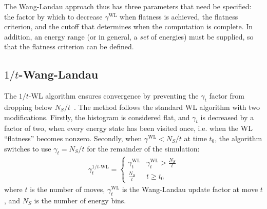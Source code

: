 \documentclass[letterpaper,twocolumn,amsmath,amssymb,pre,aps,10pt]{revtex4-1}
\begin{document}
The Wang-Landau approach thus has three parameters that need be
specified: the factor by which to decrease $\gamma^{\text{WL}}$ when flatness is
achieved, the flatness criterion, and the cutoff that determines when
the computation is complete.  In addition, an energy range (or in
general, a \emph{set} of energies) must be supplied, so that the
flatness criterion can be defined.

\subsection{$1/t$-Wang-Landau}

The $1/t$-WL algorithm ensures convergence by preventing the $\gamma_t$ factor
from dropping below $N_S/t$~\cite{belardinelli2008analysis,
schneider2017convergence}. The method follows the standard WL algorithm with two
modifications.  Firstly, the histogram is considered flat, and $\gamma_t$ is
decreased by a factor of two, when every energy state has been visited once,
i.e. when the WL ``flatness'' becomes nonzero. Secondly, when
$\gamma^{\text{WL}} < N_S/t$ at time $t_0$, the algorithm switches to use
$\gamma_t = N_S/t$ for the remainder of the simulation:
\begin{align}
  \gamma_t^{1/t\text{-WL}} = \begin{cases}
     \gamma^{\text{WL}}_t & \gamma^{\text{WL}}_t > \frac{N_S}{t} \\
     \frac{N_S}{t} & t \ge t_0
 \end{cases}
\end{align}
where $t$ is the number of moves, $\gamma^{\text{WL}}_t$ is the Wang-Landau update factor
at move $t$, and $N_S$ is the number of energy bins.
\end{document}
